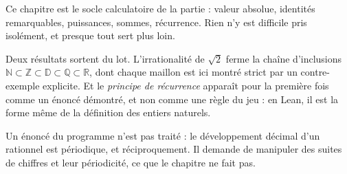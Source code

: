 Ce chapitre est le socle calculatoire de la partie : valeur absolue, identités remarquables,
puissances, sommes, récurrence. Rien n'y est difficile pris isolément, et presque tout sert
plus loin.

Deux résultats sortent du lot. L'irrationalité de $\sqrt{2}$ ferme la chaîne d'inclusions
$\mathbb{N} \subset \mathbb{Z} \subset \mathbb{D} \subset \mathbb{Q} \subset \mathbb{R}$, dont
chaque maillon est ici montré strict par un contre-exemple explicite. Et le \emph{principe de
récurrence} apparaît pour la première fois comme un énoncé démontré, et non comme une règle
du jeu : en Lean, il est la forme même de la définition des entiers naturels.

Un énoncé du programme n'est pas traité : le développement décimal d'un rationnel est
périodique, et réciproquement. Il demande de manipuler des suites de chiffres et leur
périodicité, ce que le chapitre ne fait pas.
